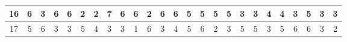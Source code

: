 \begin{sidewaystable}[]
\begin{tabular}{|c|c|c|c|c|c|c|c|c|c|c|c|c|c|c|c|c|c|c|c|c|c|c|c|c|}
    16      & 6                                               & 3                                               & 6                                               & 6                                               & 2                                               & 2                                               & 7                                               & 6                                               & 6                                               & 2                                                & 6                                                & 6                                                & 5                                               & 5                                               & 5                                               & 5                                               & 3                                               & 3                                               & 4                                               & 4                                               & 3                                               & 5                                                & 3                                                & 3                                                \\ \hline
    17      & 5                                               & 6                                               & 3                                               & 3                                               & 5                                               & 4                                               & 3                                               & 3                                               & 1                                               & 6                                                & 3                                                & 4                                                & 5                                               & 6                                               & 2                                               & 3                                               & 5                                               & 5                                               & 3                                               & 5                                               & 6                                               & 6                                                & 3                                                & 2                                                \\ \hline

\end{tabular}
\end{sidewaystable}
